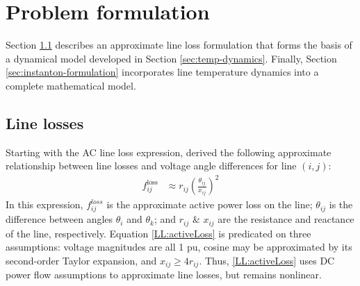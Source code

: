 \documentclass[conference]{IEEEtran}
\begin{document}
\section{Problem formulation}\label{sec:problem}

Section \ref{sec:line-losses} describes an approximate line loss formulation that forms the basis of a dynamical model developed in Section \ref{sec:temp-dynamics}. Finally, Section \ref{sec:instanton-formulation} incorporates line temperature dynamics into a complete mathematical model.



\subsection{Line losses}\label{sec:line-losses}
Starting with the AC line loss expression, \cite{almassalkhi2014} derived the following approximate relationship between line losses and voltage angle differences for line $(i,j)$:
\begin{align}
\label{LL:activeLoss}
f_{ij}^{\text{loss}} &\approx r_{ij}\left(\frac{\theta_{ij}}{x_{ij}}\right)^2
\end{align}
In this expression, $f_{ij}^{loss}$ is the approximate active power loss on the line; $\theta_{ij}$ is the difference between angles $\theta_i$ and $\theta_k$; and $r_{ij}$ \& $x_{ij}$ are the resistance and reactance of the line, respectively. Equation \eqref{LL:activeLoss} is predicated on three assumptions: voltage magnitudes are all 1 pu, cosine may be approximated by its second-order Taylor expansion, and $x_{ij} \geq 4r_{ij}$. Thus, \eqref{LL:activeLoss} uses DC power flow assumptions to approximate line losses, but remains nonlinear.
\end{document}
